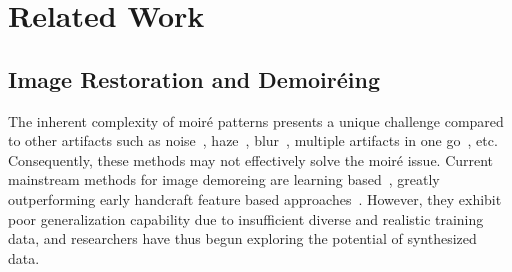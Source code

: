 \section{Related Work}
\label{sec:related-work} 

\subsection{Image Restoration and Demoiréing}
The inherent complexity of moiré patterns presents a unique challenge compared to other artifacts such as noise~\cite{xing2021end}, haze~\cite{li2021dehazeflow}, blur~\cite{lee2021iterative}, multiple artifacts in one go~\cite{luo2023refusion,zhu2023denoising,fei2023generative, zhang2023all}, etc. Consequently, these methods may not effectively solve the moiré issue. Current mainstream methods for image demoreing are learning based~\cite{sun2018moire,liu2020wavelet,luo2020deep,he2019mop,he2020fhde,niu2023progressive,wang2023coarse, yue2022recaptured, liu2024video,zheng2020image,zheng2021learning,yu2022towards}, greatly outperforming early handcraft feature based approaches~\cite{ sun2014scanned,liu2015moire,yang2017textured,yang2017demoireing}. However, they exhibit poor generalization capability due to insufficient diverse and realistic training data, and researchers have thus begun exploring the potential of synthesized data.


